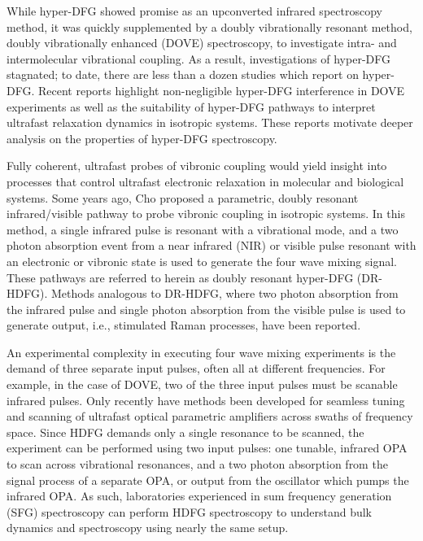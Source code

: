 \documentclass[aip, jcp, reprint, onecolumn]{revtex4-2}
\begin{document}
While hyper-DFG showed promise as an upconverted infrared spectroscopy method, it was quickly supplemented by a doubly vibrationally resonant method, doubly vibrationally enhanced (DOVE) spectroscopy, to investigate intra- and intermolecular vibrational coupling. \cite{RN345, RN101, Cho2000}
As a result, investigations of hyper-DFG stagnated; to date, there are less than a dozen studies which report on hyper-DFG. \cite{RN350, RN416, RN351, RN352, RN353, Chen1998, RN362, RN418, Bonn2024, McDonnell2024}
Recent reports highlight non-negligible hyper-DFG interference in DOVE experiments as well as the suitability of hyper-DFG pathways to interpret ultrafast relaxation dynamics in isotropic systems. \cite{Bonn2024, McDonnell2024}
These reports motivate deeper analysis on the properties of hyper-DFG spectroscopy. 

Fully coherent, ultrafast probes of vibronic coupling would yield insight into processes that control ultrafast electronic relaxation in molecular and biological systems. \cite{Bredenbeck2015, Arsenault2021}
Some years ago, Cho proposed a parametric, doubly resonant infrared/visible pathway to probe vibronic coupling in isotropic systems. \cite{Cho2001}
In this method, a single infrared pulse is resonant with a vibrational mode, and a two photon absorption event from a near infrared (NIR) or visible pulse resonant with an electronic or vibronic state is used to generate the four wave mixing signal.
These pathways are referred to herein as doubly resonant hyper-DFG (DR-HDFG).
Methods analogous to DR-HDFG, where two photon absorption from the infrared pulse and single photon absorption from the visible pulse is used to generate output, i.e., stimulated Raman processes, have been reported. \cite{RN301, RN120} 

An experimental complexity in executing four wave mixing experiments is the demand of three separate input pulses, often all at different frequencies.
For example, in the case of DOVE, two of the three input pulses must be scanable infrared pulses. \cite{RN345} 
Only recently have methods been developed for seamless tuning and scanning of ultrafast optical parametric amplifiers across swaths of frequency space. \cite{RN162, McDonnell2024, SkyeOPA, KyleOPA}
Since HDFG demands only a single resonance to be scanned, the experiment can be performed using two input pulses: one tunable, infrared OPA to scan across vibrational resonances, and a two photon absorption from the signal process of a separate OPA, or output from the oscillator which pumps the infrared OPA.
As such, laboratories experienced in sum frequency generation (SFG) spectroscopy can perform HDFG spectroscopy to understand bulk dynamics and spectroscopy using nearly the same setup.\cite{Shen1987_CPL}
\end{document}
